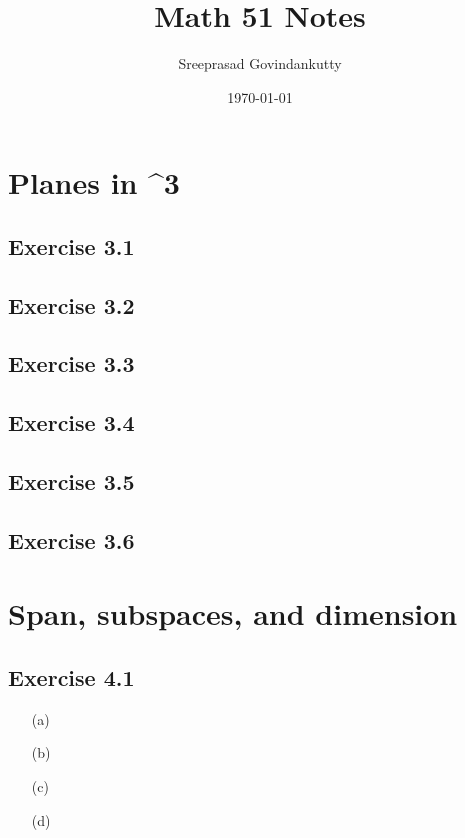 \documentclass[11pt]{article}
\title{Math 51 Notes}
\author{Sreeprasad Govindankutty}
\date{\today}
\theoremstyle{definition}
\theoremstyle{remark}
\begin{document}
\maketitle
\tableofcontents
\newpage

\section{Planes in ^3}

\subsection{Exercise 3.1}

\subsection{Exercise 3.2}

\subsection{Exercise 3.3}

\subsection{Exercise 3.4}

\subsection{Exercise 3.5}

\subsection{Exercise 3.6}


\section{Span, subspaces, and dimension}

\subsection{Exercise 4.1}

\begin{enumerate}
    \item[(a)] 
    \item[(b)] 
    \item[(c)] 
    \item[(d)] 
\end{enumerate}
\end{document}
